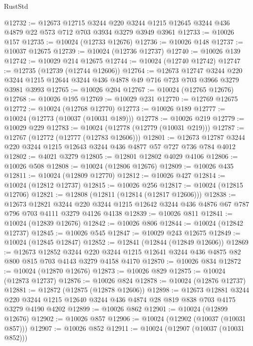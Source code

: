 \begin{lexlean}{RustStd}
\begin{coremodule}
@12732 := @12673
    @12715
    @3244
    @220
    @3244
    @1215
    @12645
    @3244
    @436
    @4879
    @22
    @573
    @712
    @703
    @3934
    @3279
    @3949
    @3961
@12733 := @10026 @157
@12735 := @10024 (@12733 @12676)
@12736 := @10026 @148
@12737 := @10037 @12675
@12739 := @10024 (@12736 @12737)
@12740 := @10026 @139
@12742 := @10029 @214 @12675
@12744 := @10024 (@12740 @12742)
@12747 := @12735 (@12739 (@12744 @12606))
@12764 := @12673
    @12747
    @3244
    @220
    @3244
    @1215
    @12644
    @3244
    @436
    @4878
    @49
    @716
    @723
    @703
    @3966
    @3279
    @3981
    @3993
@12765 := @10026 @204
@12767 := @10024 (@12765 @12676)
@12768 := @10026 @195
@12769 := @10029 @231
@12770 := @12769 @12675
@12772 := @10024 (@12768 @12770)
@12773 := @10026 @189
@12777 := @10024 (@12773 (@10037 (@10031 @189)))
@12778 := @10026 @219
@12779 := @10029 @229
@12783 := @10024 (@12778 (@12779 (@10031 @219)))
@12787 := @12767 (@12772 (@12777 (@12783 @12606)))
@12801 := @12673 @12787 @3244 @220 @3244 @1215 @12643 @3244 @436 @4877 @57 @727 @736 @784 @4012
@12802 := @4021 @3279
@12805 := @12801 @12802 @4029 @4106
@12806 := @10026 @508
@12808 := @10024 (@12806 @12676)
@12809 := @10026 @435
@12811 := @10024 (@12809 @12770)
@12812 := @10026 @427
@12814 := @10024 (@12812 @12737)
@12815 := @10026 @256
@12817 := @10024 (@12815 @12706)
@12821 := @12808 (@12811 (@12814 (@12817 @12606)))
@12838 := @12673
    @12821
    @3244
    @220
    @3244
    @1215
    @12642
    @3244
    @436
    @4876
    @67
    @787
    @796
    @703
    @4111
    @3279
    @4126
    @4138
@12839 := @10026 @811
@12841 := @10024 (@12839 @12676)
@12842 := @10026 @806
@12844 := @10024 (@12842 @12737)
@12845 := @10026 @545
@12847 := @10029 @243 @12675
@12849 := @10024 (@12845 @12847)
@12852 := @12841 (@12844 (@12849 @12606))
@12869 := @12673
    @12852
    @3244
    @220
    @3244
    @1215
    @12641
    @3244
    @436
    @4875
    @82
    @800
    @815
    @703
    @4143
    @3279
    @4158
    @4170
@12870 := @10026 @834
@12872 := @10024 (@12870 @12676)
@12873 := @10026 @829
@12875 := @10024 (@12873 @12737)
@12876 := @10026 @824
@12878 := @10024 (@12876 @12737)
@12881 := @12872 (@12875 (@12878 @12606))
@12898 := @12673
    @12881
    @3244
    @220
    @3244
    @1215
    @12640
    @3244
    @436
    @4874
    @28
    @819
    @838
    @703
    @4175
    @3279
    @4190
    @4202
@12899 := @10026 @862
@12901 := @10024 (@12899 @12676)
@12902 := @10026 @857
@12906 := @10024 (@12902 (@10037 (@10031 @857)))
@12907 := @10026 @852
@12911 := @10024 (@12907 (@10037 (@10031 @852)))

\end{coremodule}
\end{lexlean}
